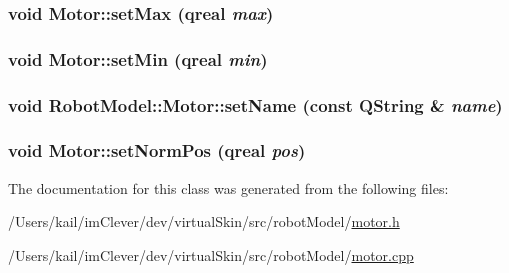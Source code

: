 \label{class_robot_model_1_1_motor_a2467c521c141e2cc9cf21d85d56dd20b}
\hypertarget{class_robot_model_1_1_motor_ad52f8d0e1aa0b5f60b388188147a1ded}{
\subsubsection[{setMax}]{\setlength{\rightskip}{0pt plus 5cm}void Motor::setMax (qreal {\em max})}}
\label{class_robot_model_1_1_motor_ad52f8d0e1aa0b5f60b388188147a1ded}
\hypertarget{class_robot_model_1_1_motor_a404e359dac5e3af43860948d9e35f725}{
\subsubsection[{setMin}]{\setlength{\rightskip}{0pt plus 5cm}void Motor::setMin (qreal {\em min})}}
\label{class_robot_model_1_1_motor_a404e359dac5e3af43860948d9e35f725}
\hypertarget{class_robot_model_1_1_motor_a9efaa43179205b53df370f7811023eb6}{
\subsubsection[{setName}]{\setlength{\rightskip}{0pt plus 5cm}void RobotModel::Motor::setName (const QString \& {\em name})}}
\label{class_robot_model_1_1_motor_a9efaa43179205b53df370f7811023eb6}
\hypertarget{class_robot_model_1_1_motor_a2c26ea7475deaef6e1546edbadf88729}{
\subsubsection[{setNormPos}]{\setlength{\rightskip}{0pt plus 5cm}void Motor::setNormPos (qreal {\em pos})}}
\label{class_robot_model_1_1_motor_a2c26ea7475deaef6e1546edbadf88729}


The documentation for this class was generated from the following files:\begin{DoxyCompactItemize}
\item 
/Users/kail/imClever/dev/virtualSkin/src/robotModel/\hyperlink{motor_8h}{motor.h}\item 
/Users/kail/imClever/dev/virtualSkin/src/robotModel/\hyperlink{motor_8cpp}{motor.cpp}\end{DoxyCompactItemize}

